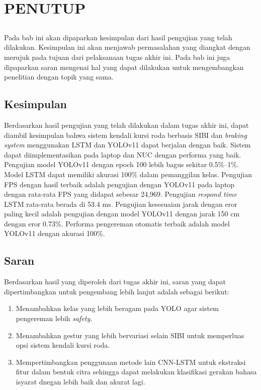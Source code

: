 \chapter{PENUTUP}
\label{sec:chap5_tutup}
\vspace{1ex}
\section*{}
Pada bab ini akan dipaparkan kesimpulan dari hasil pengujian yang telah dilakukan. Kesimpulan ini akan menjawab permasalahan yang diangkat dengan merujuk pada tujuan dari pelaksanaan tugas akhir ini. Pada bab ini juga dipaparkan saran mengenai hal yang dapat dilakukan untuk mengembangkan penelitian dengan topik yang sama. \vspace{1ex}

\section{Kesimpulan}
\label{sec:sec4_kesimpulan}
\vspace{1ex}
Berdasarkan hasil pengujian yang telah dilakukan dalam tugas akhir ini, dapat diambil kesimpulan bahwa sistem kendali kursi roda berbasis SIBI dan \emph{braking system} menggunakan LSTM dan YOLOv11 dapat berjalan dengan baik. Sistem dapat diimplementasikan pada laptop dan NUC dengan performa yang baik. Pengujian model YOLOv11 dengan epoch 100 lebih bagus sekitar 0.5\%–1\%. Model LSTM dapat memiliki akurasi 100\% dalam pemanggilan kelas. Pengujian FPS dengan hasil terbaik adalah pengujian dengan YOLOv11 pada laptop dengan rata-rata FPS yang didapat sebesar 24,969. Pengujian \emph{respond time} LSTM rata-rata berada di 53.4 ms. Pengujian kesesuaian jarak dengan eror paling kecil adalah pengujian dengan model YOLOv11 dengan jarak 150 cm dengan eror 0.73\%. Performa pengereman otomatis terbaik adalah model YOLOv11 dengan akurasi 100\%.
\section{Saran}
\label{sec:sec4_saran}
\vspace{1ex}
Berdasarkan hasil yang diperoleh dari tugas akhir ini, saran yang dapat dipertimbangkan untuk pengembang lebih lanjut adalah sebagai berikut:
\begin{enumerate}[nolistsep]
    \item Menambahkan kelas yang lebih beragam pada YOLO agar sistem pengereman lebih \emph{safety}.
    \item Menambahkan gestur yang lebih bervariasi selain SIBI untuk memperluas opsi sistem kendali kursi roda.
    \item Mempertimbangkan penggunaan metode lain CNN-LSTM untuk ekstraksi fitur dalam bentuk citra sehingga dapat melakukan klasifikasi gerakan bahasa isyarat dnegan lebih baik dan akurat lagi.
\end{enumerate}

